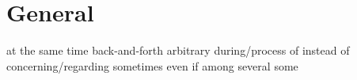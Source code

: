 \section{General}
   {at the same time}
   {back-and-forth}
   {arbitrary}
   {during/process of}
   {instead of}
   {concerning/regarding}
   {sometimes}
   {even if}
   {among}
   {several}
   {some}


